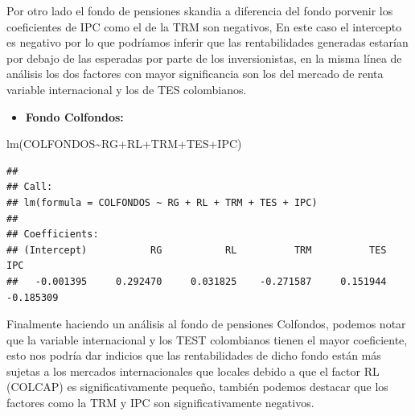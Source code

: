 \documentclass[
  12pt,
]{article}
\newenvironment{Shaded}{\begin{snugshade}}{\end{snugshade}}
\newcommand{\FunctionTok}[1]{\textcolor[rgb]{0.00,0.00,0.00}{#1}}
\newcommand{\NormalTok}[1]{#1}
\newcommand{\SpecialCharTok}[1]{\textcolor[rgb]{0.00,0.00,0.00}{#1}}
\providecommand{\tightlist}{%
  \setlength{\itemsep}{0pt}\setlength{\parskip}{0pt}}
\begin{document}
Por otro lado el fondo de pensiones skandia a diferencia del fondo
porvenir los coeficientes de IPC como el de la TRM son negativos, En
este caso el intercepto es negativo por lo que podríamos inferir que las
rentabilidades generadas estarían por debajo de las esperadas por parte
de los inversionistas, en la misma línea de análisis los dos factores
con mayor significancia son los del mercado de renta variable
internacional y los de TES colombianos.

\begin{itemize}
\tightlist
\item
  \textbf{Fondo Colfondos:}
\end{itemize}

\begin{Shaded}
\begin{Highlighting}[]
\FunctionTok{lm}\NormalTok{(COLFONDOS}\SpecialCharTok{\textasciitilde{}}\NormalTok{RG}\SpecialCharTok{+}\NormalTok{RL}\SpecialCharTok{+}\NormalTok{TRM}\SpecialCharTok{+}\NormalTok{TES}\SpecialCharTok{+}\NormalTok{IPC)}
\end{Highlighting}
\end{Shaded}

\begin{verbatim}
## 
## Call:
## lm(formula = COLFONDOS ~ RG + RL + TRM + TES + IPC)
## 
## Coefficients:
## (Intercept)           RG           RL          TRM          TES          IPC  
##   -0.001395     0.292470     0.031825    -0.271587     0.151944    -0.185309
\end{verbatim}

Finalmente haciendo un análisis al fondo de pensiones Colfondos, podemos
notar que la variable internacional y los TEST colombianos tienen el
mayor coeficiente, esto nos podría dar indicios que las rentabilidades
de dicho fondo están más sujetas a los mercados internacionales que
locales debido a que el factor RL (COLCAP) es significativamente
pequeño, también podemos destacar que los factores como la TRM y IPC son
significativamente negativos.

  
\end{document}
